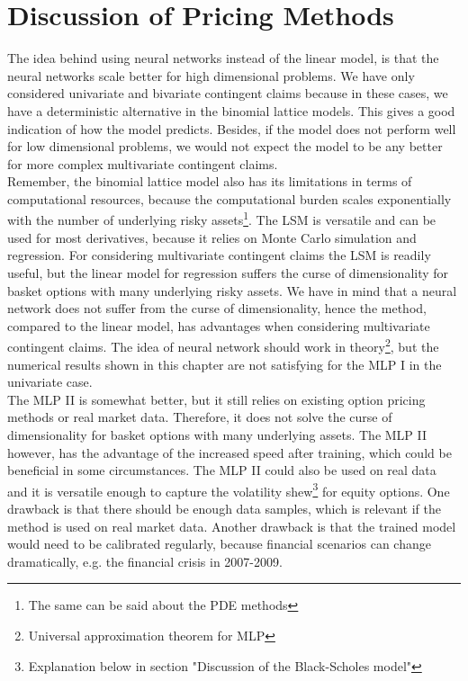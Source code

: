 \section{Discussion of Pricing Methods}
The idea behind using neural networks instead of the linear model, is that the neural networks scale better for high dimensional problems. We have only considered univariate and bivariate contingent claims because in these cases, we have a deterministic alternative in the binomial lattice models. This gives a good indication of how the model predicts. Besides, if the model does not perform well for low dimensional problems, we would not expect the model to be any better for more complex multivariate contingent claims.\\

Remember, the binomial lattice model also has its limitations in terms of computational resources, because the computational burden scales exponentially with the number of underlying risky assets\footnote{The same can be said about the PDE methods}. The LSM is versatile and can be used for most derivatives, because it relies on Monte Carlo simulation and regression. For considering multivariate contingent claims the LSM is readily useful, but the linear model for regression suffers the curse of dimensionality for basket options with many underlying risky assets. We have in mind that a neural network does not suffer from the curse of dimensionality, hence the method, compared to the linear model, has advantages when considering multivariate contingent claims. The idea of neural network should work in theory\footnote{Universal approximation theorem for MLP}, but the numerical results shown in this chapter are not satisfying for the MLP I in the univariate case.\\

The MLP II is somewhat better, but it still relies on existing option pricing methods or real market data. Therefore, it does not solve the curse of dimensionality for basket options with many underlying assets. The MLP II however, has the advantage of the increased speed after training, which could be beneficial in some circumstances. The MLP II could also be used on real data and it is versatile enough to capture the volatility shew\footnote{Explanation below in section "Discussion of the Black-Scholes model"} for equity options. One drawback is that there should be enough data samples, which is relevant if the method is used on real market data. Another drawback is that the trained model would need to be calibrated regularly, because financial scenarios can change dramatically, e.g. the financial crisis in 2007-2009.\\

